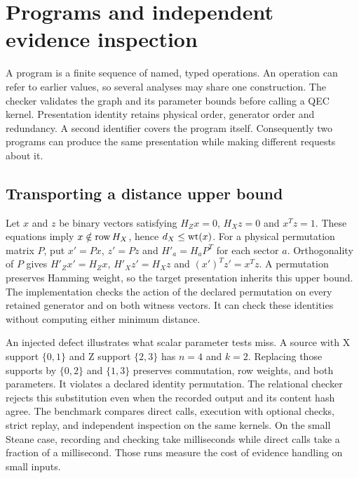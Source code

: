 \section{Programs and independent evidence inspection}

A program is a finite sequence of named, typed operations. An operation can
refer to earlier values, so several analyses may share one construction. The
checker validates the graph and its parameter bounds before calling a QEC
kernel. Presentation identity retains physical order, generator order and
redundancy. A second identifier covers the program itself. Consequently two
programs can produce the same presentation while making different requests
about it.

\subsection{Transporting a distance upper bound}
Let $x$ and $z$ be binary vectors satisfying $H_Zx=0$, $H_Xz=0$ and
$x^Tz=1$. These equations imply $x\notin\operatorname{row} H_X$, hence $d_X\leq\operatorname{wt}(x)$.
For a physical permutation matrix $P$, put $x'=Px$, $z'=Pz$ and
$H'_a=H_aP^T$ for each sector $a$. Orthogonality of $P$ gives
$H'_Zx'=H_Zx$, $H'_Xz'=H_Xz$ and $(x')^Tz'=x^Tz$. A permutation preserves
Hamming weight, so the target presentation inherits this upper bound. The
implementation checks the action of the declared permutation on every retained
generator and on both witness vectors. It can check these identities without
computing either minimum distance.

An injected defect illustrates what scalar parameter tests miss. A source
with X support $\{0,1\}$ and Z support $\{2,3\}$ has $n=4$ and $k=2$.
Replacing those supports by $\{0,2\}$ and $\{1,3\}$ preserves commutation,
row weights, and both parameters. It violates a declared identity permutation.
The relational checker rejects this substitution even when the recorded output
and its content hash agree. The benchmark compares direct calls, execution with
optional checks, strict replay, and independent inspection on the same kernels.
On the small Steane case, recording and checking take milliseconds while direct
calls take a fraction of a millisecond. Those runs measure the cost of evidence
handling on small inputs.

